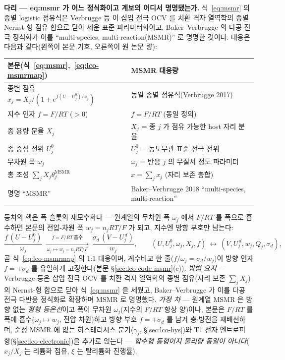 \begin{srcbox}
\textbf{다리 --- eq:msmr 가 어느 정식화이고 계보의 어디서 명명됐는가.} 식~\eqref{eq:msmr} 의 종별
logistic 점유식은 Verbrugge 등\cite{msmr_origin2017} 이 삽입 전극 OCV 를 치환 격자 열역학의 종별
Nernst-형 점유 합으로 닫아 세운 표준 파라미터화이고, Baker--Verbrugge\cite{bakerverbrugge2018} 의 다공
전극 정식화가 이를 ``multi-species, multi-reaction(MSMR)'' 로 명명한 것이다. 대응은 다음과 같다(왼쪽이
본문 기호, 오른쪽이 원 논문 량):
\begin{center}\footnotesize
\begin{tabular}{@{}ll@{}}
\hline
본문(식~\eqref{eq:msmr},~\eqref{eq:lco-msmrmap}) & MSMR\cite{msmr_origin2017,bakerverbrugge2018} 대응량 \\
\hline
종별 점유 $x_j=X_j/(1+e^{f(U-U_j^0)/\omega_j})$ & 동일 종별 점유식(Verbrugge 2017) \\
지수 인자 $f=F/RT$ ($>0$) & $f=F/RT$ (동일 정의) \\
종 용량 분율 $X_j$ & $X_j$ = 종 $j$ 가 점유 가능한 host 자리 분율 \\
종 중심 전위 $U_j^0$ & $U_j^0$ = 농도무관 표준 전극 전위 \\
무차원 폭 $\omega_j$ & $\omega_j$ = 반응 $j$ 의 무질서 정도 파라미터 \\
총 조성 $\sum_jX_j\theta_j^{\mathrm{MSMR}}$ & $x=\sum_j x_j$ (자리 보존 총합) \\
명명 ``MSMR'' & Baker--Verbrugge 2018 ``multi-species, multi-reaction'' \\
\hline
\end{tabular}
\end{center}
등치의 핵은 폭 슬롯의 재모수화다 --- 원계열의 무차원 폭 $\omega_j$ 에서 $F/RT$ 를 폭으로 흡수하면
본문의 전압-차원 폭 $w_j=n_jRT/F$ 가 되고, 지수엔 방향 부호만 남는다:
\begin{equation}
\frac{f\,(U-U_j^0)}{\omega_j}\ \xrightarrow[\ \omega_j\mapsto w_j=n_jRT/F\ ]{\ f=F/RT\ \text{흡수}\ }\
\frac{\sigma_d\,(V-U_j^{\,d})}{w_j},
\qquad (U,U_j^0,\omega_j,X_j,f)\ \leftrightarrow\ (V,U_j^{\,d},w_j,Q_j,\sigma_d),
\label{eq:br-msmr-1}
\end{equation}
곧 식~\eqref{eq:lco-msmrmap} 의 1:1 대응이며, 계수비교 한 줄($f/\omega_j=\sigma_d/w_j$)이 방향 인자
$f=+\sigma_d$ 를 유일하게 고정한다(본문 \S\ref{sec:lco-code-msmr}(c)). \emph{방법 요지} --- Verbrugge 등은 삽입 전극 OCV 를
치환 격자 열역학의 종별 점유(자리 보존 $\sum_jX_j$)의 Nernst-형 합으로 닫아 식~\eqref{eq:msmr} 을
세웠고, Baker--Verbrugge 가 이를 다공 전극 다반응 정식화로 확장하며 MSMR 로 명명했다. \emph{가정 차}
--- 원계열 MSMR 은 방향 없는 \emph{평형 등온선}이고 폭이 무차원 $\omega_j$(지수의 $F/RT$ 항상 양)이나,
본문은 $F/RT$ 를 폭에 흡수($\omega_j\!\mapsto\!w_j$, 전압 차원)하고 방향 부호 $f=+\sigma_d$ 를 남겨
충$\cdot$방전을 재배선하며, 순정 MSMR 에 없는 히스테리시스 분기($\gamma_j$, \S\ref{sec:lco-hys})와 T1
전자 엔트로피 항(\S\ref{sec:lco-electronic})을 추가로 얹는다 --- \emph{함수형 동형이지 물리량 동일이
아니다}($x_j/X_j$ 는 리튬화 점유, $\xi$ 는 탈리튬화 진행률).
\end{srcbox}

